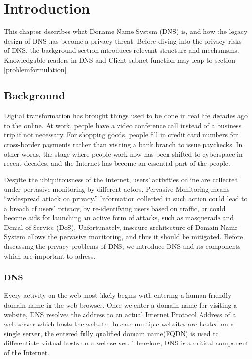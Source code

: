 \documentclass[a4paper,12pt]{article}
\begin{document}
\newpage
{}
\tableofcontents %
\newpage
{}

%
%

\section{Introduction}
This chapter describes what Doname Name System (DNS) is, and how the legacy design of DNS has become a privacy threat. Before diving into the privacy risks of DNS, the background section introduces relevant structure and mechanisms. Knowledgable readers in DNS and Client subnet function may leap to section \ref{problemformulation}.

\subsection{Background}
Digital transformation has brought things used to be done in real life decades ago to the online. At work, people have a video conference call instead of a business trip if not necessary. For shopping goods, people fill in credit card numbers for cross-border payments rather than visiting a bank branch to issue paychecks. In other words, the stage where people work now has been shifted to cyberspace in recent decades, and the Internet has become an essential part of the people.

Despite the ubiquitousness of the Internet, users' activities online are collected under pervasive monitoring by different actors.
Pervasive Monitoring means ``widespread attack on privacy\cite{rfc7258}.'' Information collected in such action could lead to a breach of users’ privacy, by re-identifying users based on traffic\cite{herrmann2010analyzing}, or could become aids for launching an active form of attacks, such as masquerade and Denial of Service (DoS).
Unfortunately, insecure architecture of Domain Name System allows the pervasive monitoring, and thus it should be mitigated. Before discussing the privacy problems of DNS, we introduce DNS and its components which are important to adress.

\subsubsection{DNS}
Every activity on the web most likely begins with entering a human-friendly domain name in the web-browser. Once we enter a domain name for visiting a website, DNS resolves the address to an actual Internet Protocol Address of a web server which hosts the website. In case multiple websites are hosted on a single server, the entered fully qualified domain name(FQDN) is used to differentiate virtual hosts on a web server\cite{virtual24host}. Therefore, DNS is a critical component of the Internet.
\end{document}
